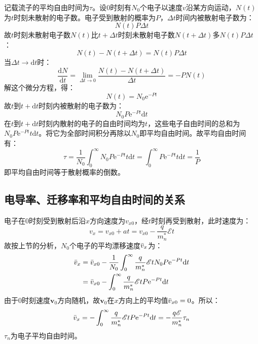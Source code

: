 记载流子的平均自由时间为$\tau$。设$0$时刻有$N_0$个电子以速度$v$沿某方向运动，$N(t)$为$t$时刻未散射的电子数。电子受到散射的概率为$P$，$\Delta t$时间内被散射电子数为：
\begin{equation*}
    N(t)P\Delta t
\end{equation*}
故$t$时刻未散射电子数$N(t)$比$t+\Delta t$时刻未散射电子数$N(t+\Delta t)$多$N(t)P\Delta t$：
\begin{equation}
    N(t)-N(t+\Delta t)=N(t)P\Delta t
\end{equation}
当$\Delta t\rightarrow \mathrm{d}t$时：
\begin{equation}
    \frac{\mathrm{d}N}{\mathrm{d}t}=\lim_{\Delta t\rightarrow 0}\frac{N(t)-N(t+\Delta t)}{\Delta t}=-PN(t)
\end{equation}
解这个微分方程，得：
\begin{equation}
    N(t)=N_0\mathrm{e}^{-Pt}
\end{equation}
故$t$到$t+\mathrm{d}t$时刻内被散射的电子数为：
\begin{equation*}
    N_0P\mathrm{e}^{-Pt}\mathrm{d}t
\end{equation*}
在$t$到$t+\mathrm{d}t$时刻内散射的电子的自由时间均为$t$，这些电子自由时间的总和为$N_0P\mathrm{e}^{-Pt}t\mathrm{d}t$。将它为全部时间积分再除以$N_0$即平均自由时间。故平均自由时间有：
\begin{equation}
    \tau=\frac{1}{N_0}\int_0^\infty N_0P\mathrm{e}^{-Pt}t\mathrm{d}t=\int_0^\infty P\mathrm{e}^{-Pt}t\mathrm{d}t=\frac{1}{P}
\end{equation}
即平均自由时间等于散射概率的倒数。

\subsection{电导率、迁移率和平均自由时间的关系}

电子在$0$时刻受到散射后沿$x$方向速度为$v_{x0}$，经$t$时刻再受到散射，此时速度为：
\begin{equation}
    v_x=v_{x0}+at=v_{x0}-\frac{q}{m_n^*}\mathscr{E}t
\end{equation}
故按上节的分析，$N_0$个电子的平均漂移速度$\Bar{v}_x$为：
\begin{align}
    \Bar{v}_x&=\Bar{v}_{x0}-\frac{1}{N_0}\int_0^\infty\frac{q}{m_n^*}\mathscr{E}tN_0P\mathrm{e}^{-Pt}\mathrm{d}t\\
    &=\Bar{v}_{x0}-\int_0^\infty\frac{q}{m_n^*}\mathscr{E}tP\mathrm{e}^{-Pt}\mathrm{d}t
\end{align}
由于$0$时刻速度$\bm v_0$方向随机，故$\bm v_0$在$x$方向上的平均值$\Bar{v}_{x0}=0$。所以：
\begin{equation}
    \Bar{v}_x=-\int_0^\infty\frac{q}{m_n^*}\mathscr{E}tP\mathrm{e}^{-Pt}\mathrm{d}t=-\frac{q\mathscr{E}}{m_n^*}\tau_n
\end{equation}
$\tau_n$为电子平均自由时间。

